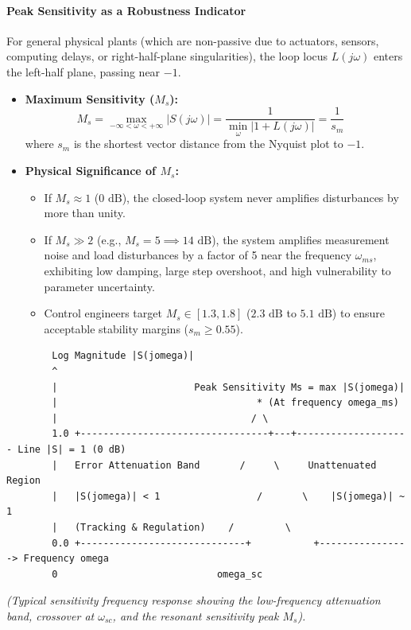 \documentclass[12pt,onecolumn,twoside ]{article}
\begin{document}
	\paragraph{Peak Sensitivity as a Robustness Indicator}
	For general physical plants (which are non-passive due to actuators, sensors, computing delays, or right-half-plane singularities), the loop locus $L(j\omega)$ enters the left-half plane, passing near $-1$.
	\begin{itemize}
		\item
		\textbf{Maximum Sensitivity ($M_s$):} \[
		M_s = \max_{-\infty < \omega < +\infty} |S(j\omega)| = \frac{1}{\min_\omega |1 + L(j\omega)|} = \frac{1}{s_m} \quad
		\] where $s_m$ is the shortest vector distance from the Nyquist plot to $-1$.
		\item
		\textbf{Physical Significance of $M_s$:}
		\begin{itemize}
			\item
			If $M_s \approx 1$ ($0\text{ dB}$), the closed-loop system never amplifies disturbances by more than unity.
			\item
			If $M_s \gg 2$ (e.g., $M_s = 5 \implies 14\text{ dB}$), the system amplifies measurement noise and load disturbances by a factor of 5 near the frequency $\omega_{ms}$, exhibiting low damping, large step overshoot, and high vulnerability to parameter uncertainty.
			\item
			Control engineers target $M_s \in [1.3, 1.8]$ ($2.3\text{ dB}$ to $5.1\text{ dB}$) to ensure acceptable stability margins ($s_m \ge 0.55$).
		\end{itemize}
	\end{itemize}
	\begin{lstlisting}
		Log Magnitude |S(jomega)|
		^
		|                        Peak Sensitivity Ms = max |S(jomega)|
		|                                   * (At frequency omega_ms)
		|                                  / \
		1.0 +---------------------------------+---+-------------------- Line |S| = 1 (0 dB)
		|   Error Attenuation Band       /     \     Unattenuated Region
		|   |S(jomega)| < 1                 /       \    |S(jomega)| ~ 1
		|   (Tracking & Regulation)    /         \
		0.0 +-----------------------------+           +----------------> Frequency omega
		0                            omega_sc
	\end{lstlisting}
	\textit{(Typical sensitivity frequency response showing the low-frequency attenuation band, crossover at $\omega_{sc}$, and the resonant sensitivity peak $M_s$).}
	
\end{document}
